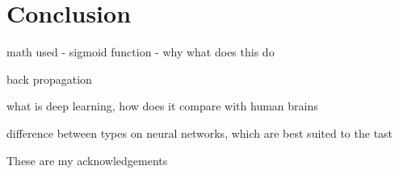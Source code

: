 \documentclass[sigconf]{acmart}
\begin{document}
\section{Conclusion}

math used - sigmoid function - why what does this do

back propagation

what is deep learning, how does it compare with human brains

difference between types on neural networks, which are best suited to the tast

 
\begin{acks}

 These are my acknowledgements

\end{acks}



 


\appendix
 


\end{document}
